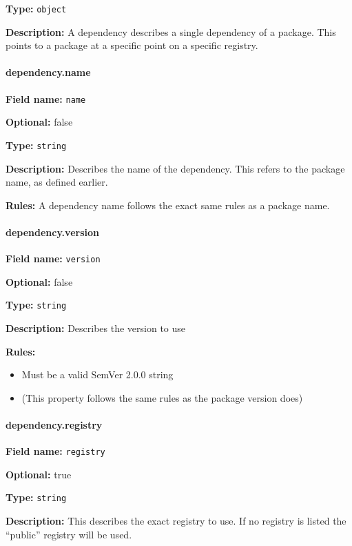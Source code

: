 \textbf{Type:} \texttt{object}

\textbf{Description:} A dependency describes a single dependency of a
package. This points to a package at a specific point on a specific
registry.

\hypertarget{name-1}{\paragraph{dependency.name}\label{name-1}}

\textbf{Field name:} \texttt{name}

\textbf{Optional:} false

\textbf{Type:} \texttt{string}

\textbf{Description:} Describes the name of the dependency. This refers
to the package name, as defined earlier.

\textbf{Rules:} A dependency name follows the exact same rules as a
package name.

\hypertarget{version-1}{\paragraph{dependency.version}\label{version-1}}

\textbf{Field name:} \texttt{version}

\textbf{Optional:} false

\textbf{Type:} \texttt{string}

\textbf{Description:} Describes the version to use

\textbf{Rules:}

\begin{itemize}
\tightlist
\item
  Must be a valid SemVer 2.0.0 string
\item
  (This property follows the same rules as the package version does)
\end{itemize}

\hypertarget{registry}{\paragraph{dependency.registry}\label{registry}}

\textbf{Field name:} \texttt{registry}

\textbf{Optional:} true

\textbf{Type:} \texttt{string}

\textbf{Description:} This describes the exact registry to use. If no
registry is listed the ``public'' registry will be used.

